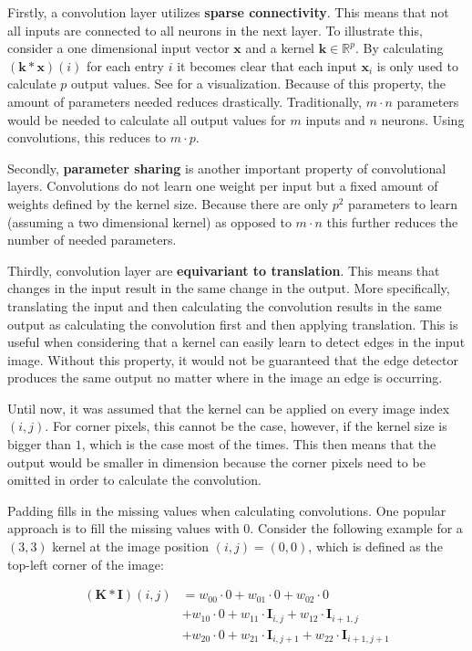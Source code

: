 Firstly, a convolution layer utilizes \textbf{sparse connectivity}.
This means that not all inputs are connected to all neurons in the next layer.
To illustrate this, consider a one dimensional input vector $\bm{x}$ and a kernel $\bm{k} \in \mathbb{R}^p$.
By calculating $(\bm{k} * \bm{x})(i)$ for each entry $i$ it becomes clear that each input $\bm{x}_i$ is only used to calculate $p$ output values.
See  for a visualization.
Because of this property, the amount of parameters needed reduces drastically.
Traditionally, $m \cdot n$ parameters would be needed to calculate all output values for $m$ inputs and $n$ neurons.
Using convolutions, this reduces to $m \cdot p$.

Secondly, \textbf{parameter sharing} is another important property of convolutional layers.
Convolutions do not learn one weight per input but a fixed amount of weights defined by the kernel size.
Because there are only $p^2$ parameters to learn (assuming a two dimensional kernel) as opposed to $m \cdot n$ this further reduces the number of needed parameters.

Thirdly, convolution layer are \textbf{equivariant to translation}.
This means that changes in the input result in the same change in the output.
More specifically, translating the input and then calculating the convolution results in the same output as calculating the convolution first and then applying translation.
This is useful when considering that a kernel can easily learn to detect edges in the input image.
Without this property, it would not be guaranteed that the edge detector produces the same output no matter where in the image an edge is occurring.

Until now, it was assumed that the kernel can be applied on every image index $(i,j)$.
For corner pixels, this cannot be the case, however, if the kernel size is bigger than $1$, which is the case most of the times.
This then means that the output would be smaller in dimension because the corner pixels need to be omitted in order to calculate the convolution.

Padding fills in the missing values when calculating convolutions.
One popular approach is to fill the missing values with $0$. Consider the following example for a $(3,3)$ kernel at the image position $(i,j) = (0,0)$, which is defined as the top-left corner of the image:

\begin{equation}
    \begin{split}
        (\bm{K} * \bm{I})(i,j)
        &= w_{00} \cdot 0 + w_{01} \cdot 0 + w_{02} \cdot 0 \\
        &+ w_{10} \cdot 0 + w_{11} \cdot \bm{I}_{i,j} + w_{12} \cdot \bm{I}_{i+1,j} \\
        &+ w_{20} \cdot 0 + w_{21} \cdot \bm{I}_{i,j+1} + w_{22} \cdot \bm{I}_{i+1,j+1}
    \end{split}
\end{equation}

